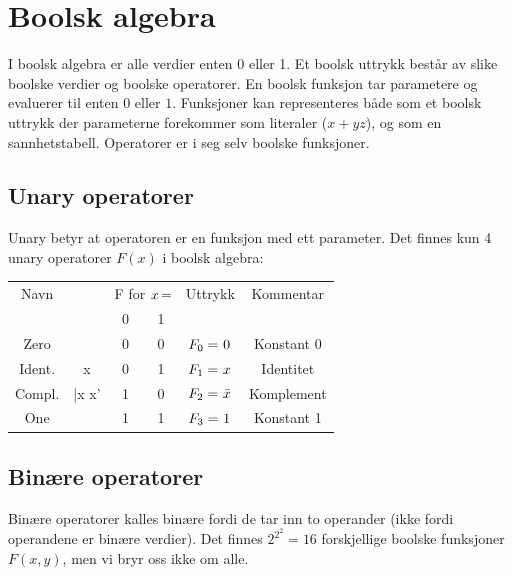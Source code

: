 \documentclass[12pt,a4paper,norsk]{article}
\begin{document}
\newcommand{\varkern}{\hspace{0.06em}}
\newcommand{\var}[1]{\varkern#1\varkern}
\newcommand{\kom}[1]{\varkern\bar{#1}\varkern}
\newcommand{\xor}{\oplus}
\newcommand{\xnor}{\odot}

\section{Boolsk algebra}\label{sec:bool_alg}
I boolsk algebra er alle verdier enten 0 eller 1. Et boolsk uttrykk består av
slike boolske verdier og boolske operatorer. En boolsk funksjon tar parametere
og evaluerer til enten $0$ eller $1$. Funksjoner kan representeres både som et
boolsk uttrykk der parameterne forekommer som literaler ($x+yz$), og
som en sannhetstabell. Operatorer er i seg selv boolske funksjoner.

\subsection{Unary operatorer}
Unary betyr at operatoren er en funksjon med ett parameter.
Det finnes kun 4 unary operatorer $F(x)$ i boolsk algebra:
\begin{table}[H]
\centering
\begin{tabular}{ |c|C|C|C|c|c| }
  \toprule
  Navn &  & \multicolumn{2}{|c|}{F for $\var{x}$=} & Uttrykk & Kommentar \\
  & & 0 & 1 & & \\
  \midrule
  Zero & & 0 & 0 & $F_{0} = \var{0}$ & Konstant 0 \\
  Ident. & \var{x} & 0 & 1 & $F_{1} = \var{x}$ & Identitet \\
  Compl. & \kom{x} \text{/} \var{x'} & 1 & 0 & $F_{2} = \kom{x}$ & Komplement \\
  One & & 1 & 1 & $F_{3} = \var{1}$ & Konstant 1 \\
  \bottomrule
\end{tabular}
\end{table}

\subsection{Binære operatorer}
Binære operatorer kalles binære fordi de tar inn to operander (ikke fordi
operandene er binære verdier). Det finnes $2^{2^{2}} = 16$ forskjellige boolske
funksjoner $F(x,y)$, men vi bryr oss ikke om alle.
\end{document}
